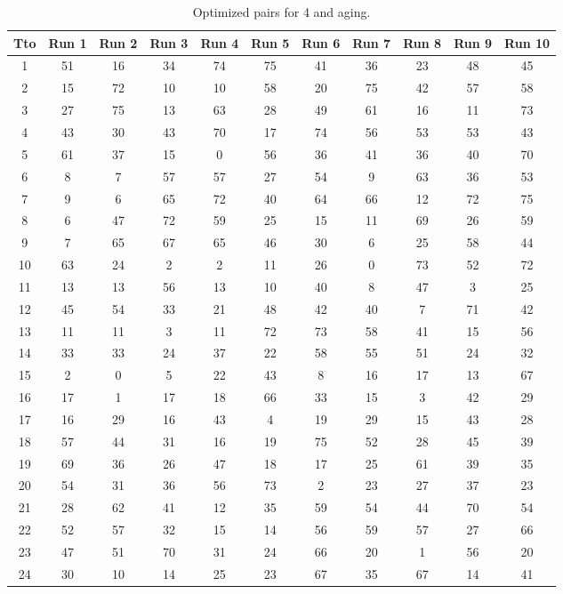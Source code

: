 \begin{table}
  \centering
  \scriptsize
  \caption{Optimized pairs for 4 and aging.}
  \label{tab_pairs}
\begin{tabular}{c c c c c c c c c c c }
\hline
Tto & Run 1 & Run 2 & Run 3 & Run 4 & Run 5 & Run 6 & Run 7 & Run 8 & Run 9 & Run 10 \\
\hline
1 & 51 & 16 & 34 & 74 & 75 & 41 & 36 & 23 & 48 & 45 \\
2 & 15 & 72 & 10 & 10 & 58 & 20 & 75 & 42 & 57 & 58 \\
3 & 27 & 75 & 13 & 63 & 28 & 49 & 61 & 16 & 11 & 73 \\
4 & 43 & 30 & 43 & 70 & 17 & 74 & 56 & 53 & 53 & 43 \\
5 & 61 & 37 & 15 & 0 & 56 & 36 & 41 & 36 & 40 & 70 \\
6 & 8 & 7 & 57 & 57 & 27 & 54 & 9 & 63 & 36 & 53 \\
7 & 9 & 6 & 65 & 72 & 40 & 64 & 66 & 12 & 72 & 75 \\
8 & 6 & 47 & 72 & 59 & 25 & 15 & 11 & 69 & 26 & 59 \\
9 & 7 & 65 & 67 & 65 & 46 & 30 & 6 & 25 & 58 & 44 \\
10 & 63 & 24 & 2 & 2 & 11 & 26 & 0 & 73 & 52 & 72 \\
11 & 13 & 13 & 56 & 13 & 10 & 40 & 8 & 47 & 3 & 25 \\
12 & 45 & 54 & 33 & 21 & 48 & 42 & 40 & 7 & 71 & 42 \\
13 & 11 & 11 & 3 & 11 & 72 & 73 & 58 & 41 & 15 & 56 \\
14 & 33 & 33 & 24 & 37 & 22 & 58 & 55 & 51 & 24 & 32 \\
15 & 2 & 0 & 5 & 22 & 43 & 8 & 16 & 17 & 13 & 67 \\
16 & 17 & 1 & 17 & 18 & 66 & 33 & 15 & 3 & 42 & 29 \\
17 & 16 & 29 & 16 & 43 & 4 & 19 & 29 & 15 & 43 & 28 \\
18 & 57 & 44 & 31 & 16 & 19 & 75 & 52 & 28 & 45 & 39 \\
19 & 69 & 36 & 26 & 47 & 18 & 17 & 25 & 61 & 39 & 35 \\
20 & 54 & 31 & 36 & 56 & 73 & 2 & 23 & 27 & 37 & 23 \\
21 & 28 & 62 & 41 & 12 & 35 & 59 & 54 & 44 & 70 & 54 \\
22 & 52 & 57 & 32 & 15 & 14 & 56 & 59 & 57 & 27 & 66 \\
23 & 47 & 51 & 70 & 31 & 24 & 66 & 20 & 1 & 56 & 20 \\
24 & 30 & 10 & 14 & 25 & 23 & 67 & 35 & 67 & 14 & 41 \\

\end{tabular}
\end{table}
